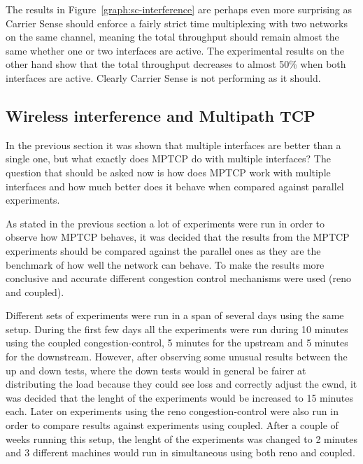 \documentclass[12pt,a4paper]{article}
\begin{document}
The results in Figure~\ref{graph:sc-interference} are perhaps even more
surprising as Carrier Sense should enforce a fairly strict time multiplexing
with two networks on the same channel, meaning the total throughput should
remain almost the same whether one or two interfaces are active. The
experimental results on the other hand show that the total throughput decreases
to almost 50\% when both interfaces are active. Clearly Carrier Sense is not
performing as it should.

\subsection{Wireless interference and Multipath TCP}

In the previous section it was shown that multiple interfaces are better than a
single one, but what exactly does MPTCP do with multiple interfaces? The
question that should be asked now is how does MPTCP work with multiple
interfaces and how much better does it behave when compared against parallel
experiments.

As stated in the previous section a lot of experiments were run in order to
observe how MPTCP behaves, it was decided that the results from the MPTCP
experiments should be compared against the parallel ones as they are the
benchmark of how well the network can behave. To make the results more
conclusive and accurate different congestion control mechanisms were used (reno
and coupled).

Different sets of experiments were run in a span of several days using the same
setup. During the first few days all the experiments were run during 10 minutes
using the coupled congestion-control, 5 minutes for the upstream and 5 minutes
for the downstream. However, after observing some unusual results between the up
and down tests, where the down tests would in general be fairer at distributing
the load because they could see loss and correctly adjust the cwnd, it was
decided that the lenght of the experiments would be increased to 15 minutes
each. Later on experiments using the reno congestion-control were also run in
order to compare results against experiments using coupled. After a couple of
weeks running this setup, the lenght of the experiments was changed to 2 minutes
and 3 different machines would run in simultaneous using both reno and coupled.

\end{document}
